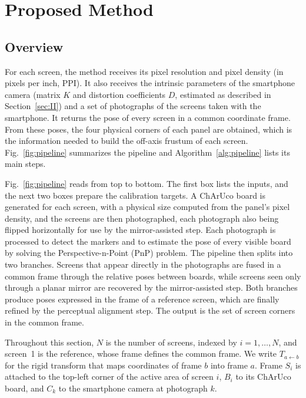 \documentclass[english,hidelinks]{sbrt}
\begin{document}
\section{Proposed Method}
\label{sec:III}

\subsection{Overview}
For each screen, the method receives its pixel resolution and pixel density (in pixels per inch, PPI). It also receives the intrinsic parameters of the smartphone camera (matrix $K$ and distortion coefficients $D$, estimated as described in Section~\ref{sec:II}) and a set of photographs of the screens taken with the smartphone. It returns the pose of every screen in a common coordinate frame. From these poses, the four physical corners of each panel are obtained, which is the information needed to build the off-axis frustum of each screen. Fig.~\ref{fig:pipeline} summarizes the pipeline and Algorithm~\ref{alg:pipeline} lists its main steps.

Fig.~\ref{fig:pipeline} reads from top to bottom. The first box lists the inputs, and the next two boxes prepare the calibration targets. A ChArUco board is generated for each screen, with a physical size computed from the panel's pixel density, and the screens are then photographed, each photograph also being flipped horizontally for use by the mirror-assisted step. Each photograph is processed to detect the markers and to estimate the pose of every visible board by solving the Perspective-n-Point (PnP) problem. The pipeline then splits into two branches. Screens that appear directly in the photographs are fused in a common frame through the relative poses between boards, while screens seen only through a planar mirror are recovered by the mirror-assisted step. Both branches produce poses expressed in the frame of a reference screen, which are finally refined by the perceptual alignment step. The output is the set of screen corners in the common frame.

Throughout this section, $N$ is the number of screens, indexed by $i = 1,\dots,N$, and screen~1 is the reference, whose frame defines the common frame. We write $T_{a\leftarrow b}$ for the rigid transform that maps coordinates of frame $b$ into frame $a$. Frame $S_i$ is attached to the top-left corner of the active area of screen $i$, $B_i$ to its ChArUco board, and $C_k$ to the smartphone camera at photograph $k$.
\end{document}
